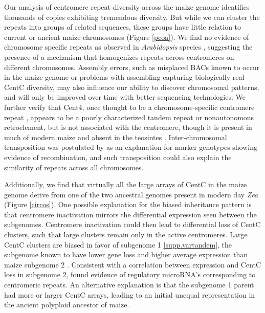 
Our analysis of centromere repeat diversity across the maize genome identifies thousands of copies exhibiting tremendous diversity. 
But while we can cluster the repeats into groups of related sequences, these groups have little relation to current or ancient maize chromosomes (Figure \ref{pcoa}).
We find no evidence of chromosome specific repeats as observed in \emph{Arabidopsis} species \citep{Kawabe2005, Pontes2004}, suggesting the presence of a mechanism that homogenizes repeats across centromeres on different chromosomes.
Assembly errors, such as misplaced BACs known to occur in the maize genome or problems with assembling capturing biologically real CentC diversity, may also influence our ability to discover chromosomal patterns, and will only be improved over time with better sequencing technologies.
We further verify that Cent4, once thought to be a chromosome-specific centromere repeat \citep{Page2001}, appears to be a poorly characterized tandem repeat or nonautonomous retroelement, but is not associated with the centromere, though it is present in much of modern maize and absent in the teosintes \citep{albert2010}.  
Inter-chromosomal transposition was postulated by \citet{Shi2010} as an explanation for marker genotypes showing evidence of recombination, and such transposition could also explain the similarity of repeats across all chromosomes. 

Additionally, we find that virtually all the large arrays of CentC in the maize  genome derive from one of the two ancestral genomes present in modern day \emph{Zea} (Figure \ref{circos}).  
One possible explanation for the biased inheritance pattern is that centromere inactivation mirrors the differential expression seen between the subgenomes.  
Centromere inactivation could then lead to differential loss of CentC clusters, such that large clusters remain only in the active centromeres.
Large CentC clusters are biased in favor of subgenome 1 \ref{supp.vartandem}, the subgenome known to have lower gene loss and higher average expression than maize subgenome 2 \citep{Schnable2011}. 
Consistent with a correlation between expression and CentC loss in subgenome 2, \citet{ReinhartBartel2002} found evidence of regulatory microRNA’s corresponding to centromeric repeats.
An alternative explanation is that the subgenome 1 parent had more or larger CentC arrays, leading to an initial unequal representation in the ancient polyploid ancestor of maize.

